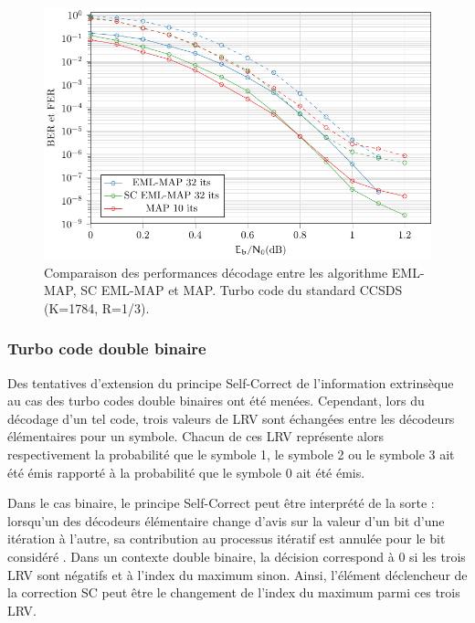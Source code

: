 \begin{figure}[tb]
	\centering
	\includegraphics[width=.8\textwidth]{main/ch2_fig/tikz/ccsds_sc.pdf}
	\vspace*{.3cm}
	\caption{\label{fig:ccsds_sc}Comparaison des performances décodage entre les algorithme EML-MAP, SC EML-MAP et MAP. Turbo code du standard CCSDS (K=1784, R=1/3).}
\end{figure}


\subsubsection{Turbo code double binaire}
Des tentatives d'extension du principe Self-Correct de l'information extrinsèque au cas des turbo codes double binaires 
ont été menées. Cependant, lors du décodage d'un tel code, trois valeurs de LRV sont échangées entre les décodeurs 
élémentaires pour un symbole. Chacun de ces LRV représente alors respectivement la probabilité que le symbole 1, le symbole 
2 ou le symbole 3 ait été émis rapporté à la probabilité que le symbole 0 ait été émis. 

Dans le cas binaire, le principe Self-Correct peut être interprété de la sorte : \og lorsqu'un des décodeurs élémentaire 
change d'avis sur la valeur d'un bit d'une itération à l'autre, sa contribution au processus itératif est annulée pour 
le bit considéré \fg. Dans un contexte double binaire, la décision correspond à 0 si les trois LRV sont négatifs et à 
l'index du maximum sinon. Ainsi, l'élément déclencheur de la correction SC peut être le changement de l'index du maximum 
parmi ces trois LRV.

